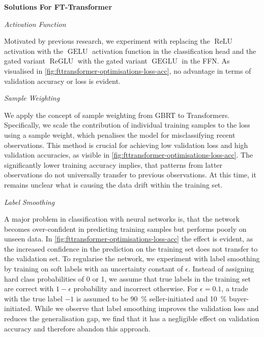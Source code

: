 \textbf{Solutions For FT-Transformer}

\emph{Activation Function}

Motivated by previous research, we experiment with replacing the $\operatorname{ReLU}$ activation with the $\operatorname{GELU}$ activation function \autocite[][2]{hendrycksGaussianErrorLinear2020} in the classification head and the gated variant $\operatorname{ReGLU}$ with the gated variant $\operatorname{GEGLU}$ \autocite[][2]{shazeerGLUVariantsImprove2020} in the \gls{FFN}. As visualised in \cref{fig:fttransformer-optimisations-loss-acc}, no advantage in terms of validation accuracy or loss is evident.

\emph{Sample Weighting}

We apply the concept of sample weighting from \gls{GBRT} to Transformers. Specifically, we scale the contribution of individual training samples to the loss using a sample weight, which penalises the model for misclassifying recent observations. This method is crucial for achieving low validation loss and high validation accuracies, as visible in \cref{fig:fttransformer-optimisations-loss-acc}. The significantly lower training accuracy implies, that patterns from latter observations do not universally transfer to previous observations. At this time, it remains unclear what is causing the data drift within the training set.

\clearpage

\emph{Label Smoothing}

A major problem in classification with neural networks is, that the network becomes over-confident in predicting training samples but performs poorly on unseen data. In \cref{fig:fttransformer-optimisations-loss-acc} the effect is evident, as the increased confidence in the prediction on the training set does not transfer to the validation set. To regularise the network, we experiment with label smoothing \autocite[][2823]{szegedyRethinkingInceptionArchitecture2016} by training on soft labels with an uncertainty constant of $\epsilon$. Instead of assigning hard class probabilities of 0 or 1, we assume that true labels in the training set are correct with $1-\epsilon$ probability and incorrect otherwise. For $\epsilon=\num{0.1}$, a trade with the true label $-1$ is assumed to be \SI{90}{\percent} seller-initiated and \SI{10}{\percent} buyer-initiated. While we observe that label smoothing improves the validation loss and reduces the generalisation gap, we find that it has a negligible effect on validation accuracy and therefore abandon this approach.

